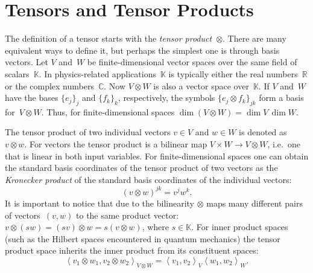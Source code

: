\documentclass[aps,pra,12pt,nofootinbib,superscriptaddress,longbibliography]{revtex4-1}
\theoremstyle{plain}
\theoremstyle{definition}
\newcommand{\inprod}[2]{\ensuremath{\left\langle #1, #2 \right\rangle}}
\newcommand{\R}{{\mathbb R}}  %
\newcommand{\C}{{\mathbb C}}  %
\newcommand{\K}{{\mathbb K}}  %
\newcommand{\spidx}[3]{^{(#1)}{}\indices{^{#2}_{#3}}}
\newcommand{\bv}{e}     %
\newcommand{\dv}{\eta}  %
\newcommand{\be}{\begin{equation}}
\newcommand{\ee}{\end{equation}}
\begin{document}
\clearpage
\appendix
\section{Tensors and Tensor Products}
\label{app:tensor}

The definition of a tensor starts with the \emph{tensor product}~$\otimes$.
There are many equivalent ways to define it, but perhaps the simplest one is
through basis vectors.
Let $V$ and~$W$ be finite-dimensional vector spaces over the same field of scalars~$\K$.
In physics-related applications~$\K$ is typically either the real numbers~$\R$
or the complex numbers~$\C$.
Now $V \otimes W$ is also a vector space over~$\K$.
If $V$ and~$W$ have the bases
$\{e_j\}_j$ and $\{f_k\}_k$, respectively,
the symbols $\{e_j \otimes f_k\}_{jk}$ form a basis for~$V \otimes W$.
Thus, for finite-dimensional spaces
$\dim(V \otimes W) = \dim V \, \dim W$.

The tensor product of two individual vectors $v \in V$ and $w \in W$
is denoted as $v \otimes w$.
For vectors the tensor product is a bilinear map
$V \times W \to V \otimes W$,
i.e.~one that is linear in both input variables.
For finite-dimensional spaces
one can obtain the standard basis coordinates of the tensor product of two vectors
as the \emph{Kronecker product} of the standard basis coordinates of the individual vectors:
\be
(v \otimes w)^{jk} = v^j w^k.
\ee
It is important to notice that due to the bilinearity $\otimes$ maps
many different pairs of vectors~$(v,w)$ to the same product vector:
$v \otimes (s w) = (s v) \otimes w = s (v \otimes w)$, where $s \in \K$.
For inner product spaces (such as the Hilbert spaces encountered in
quantum mechanics) the tensor product space inherits the inner product
from its constituent spaces:
\be
\inprod{v_1 \otimes w_1}{v_2 \otimes w_2}_{V \otimes W} = \inprod{v_1}{v_2}_V \inprod{w_1}{w_2}_W.
\ee
\end{document}
